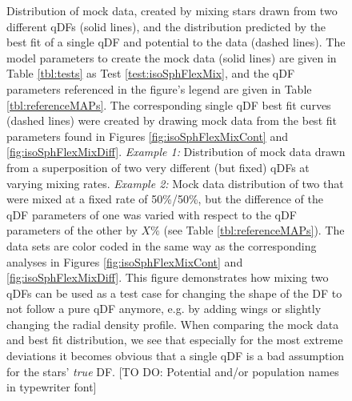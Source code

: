 \begin{figure}
\caption{Distribution of mock data, created by mixing stars drawn from two different qDFs (solid lines), and the distribution predicted by the best fit of a single qDF and potential to the data (dashed lines). The model parameters to create the mock data (solid lines) are given in Table \ref{tbl:tests} as Test \ref{test:isoSphFlexMix}, and the qDF parameters referenced in the figure's legend are given in Table \ref{tbl:referenceMAPs}. The corresponding single qDF best fit curves (dashed lines) were created by drawing mock data from the best fit parameters found in Figures \ref{fig:isoSphFlexMixCont} and \ref{fig:isoSphFlexMixDiff}. \emph{Example 1:} Distribution of mock data drawn from a superposition of two very different (but fixed) qDFs at varying mixing rates. \emph{Example 2:} Mock data distribution of two \MAPs{} that were mixed at a fixed rate of 50\%/50\%, but the difference of the qDF parameters of one \MAP{} was varied with respect to the qDF parameters of the other \MAP{} by $X\%$ (see Table \ref{tbl:referenceMAPs}). The data sets are color coded in the same way as the corresponding analyses in Figures  \ref{fig:isoSphFlexMixCont} and \ref{fig:isoSphFlexMixDiff}. This figure demonstrates how mixing two qDFs can be used as a test case for changing the shape of the DF to not follow a pure qDF anymore, e.g. by adding wings or slightly changing the radial density profile. When comparing the mock data and best fit distribution, we see that especially for the most extreme deviations it becomes obvious that a single qDF is a bad assumption for the stars' \emph{true} DF. [TO DO: Potential and/or population names in typewriter font]}
\label{fig:isoSphFlexMix_mockdata_residuals}
\end{figure}



